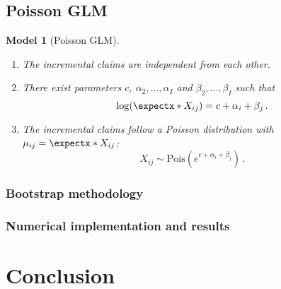 \documentclass[a4paper]{book}
\theoremstyle{plain}
\newtheorem{model}{Model}
\newcommand{\condexpp}{\mathbb{E}\condexppx}
\newcommand\expect[2][]{\expectx*{#1}{#2}}
\begin{document}

\section{Poisson GLM}

\begin{model}[Poisson GLM] \leavevmode \label{model:poisson}
    \begin{enumerate}
        \item The incremental claims are independent from each other.
        \item There exist parameters $c$, $\alpha_2, \dots, \alpha_I$ and $\beta_2, \dots, \beta_I$ such that
        \begin{equation}
            \log(\expect{X_{ij}}) = c + \alpha_i + \beta_j \,.
        \end{equation}
        \item The incremental claims follow a Poisson distribution with $\mu_{ij} = \expect{X_{ij}}$:
        \begin{equation}
            X_{ij} \sim \mathrm{Pois}(e^{c + \alpha_i + \beta_j}) \,.
        \end{equation}
    \end{enumerate}
\end{model}

\subsection{Bootstrap methodology}

\subsection{Numerical implementation and results}

\backmatter%
\chapter{Conclusion}

\printbibliography%
\end{document}
